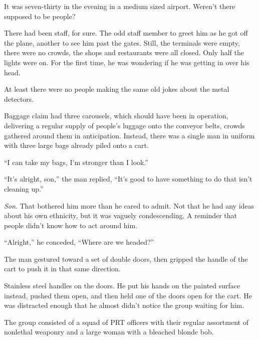 





It was seven-thirty in the evening in a medium sized airport.  Weren't there supposed to be people?



There had been staff, for sure.  The odd staff member to greet him as he got off the plane, another to see him past the gates.  Still, the terminals were empty, there were no crowds, the shops and restaurants were all closed.  Only half the lights were on.  For the first time, he was wondering if he was getting in over his head.



At least there were no people making the same old jokes about the metal detectors.



Baggage claim had three carousels, which should have been in operation, delivering a regular supply of people's luggage onto the conveyor belts, crowds gathered around them in anticipation.  Instead, there was a single man in uniform with three large bags already piled onto a cart.



``I can take my bags, I'm stronger than I look.''



``It's alright, son,'' the man replied, ``It's good to have something to do that isn't cleaning up.''



\emph{Son}.  That bothered him more than he cared to admit.  Not that he had any ideas about his own ethnicity, but it was vaguely condescending.  A reminder that people didn't know how to act around him.



``Alright,'' he conceded, ``Where are we headed?''



The man gestured toward a set of double doors, then gripped the handle of the cart to push it in that same direction.



Stainless steel handles on the doors.  He put his hands on the painted surface instead, pushed them open, and then held one of the doors open for the cart.  He was distracted enough that he almost didn't notice the group waiting for him.



The group consisted of a squad of PRT officers with their regular assortment of nonlethal weaponry and a large woman with a bleached blonde bob.



